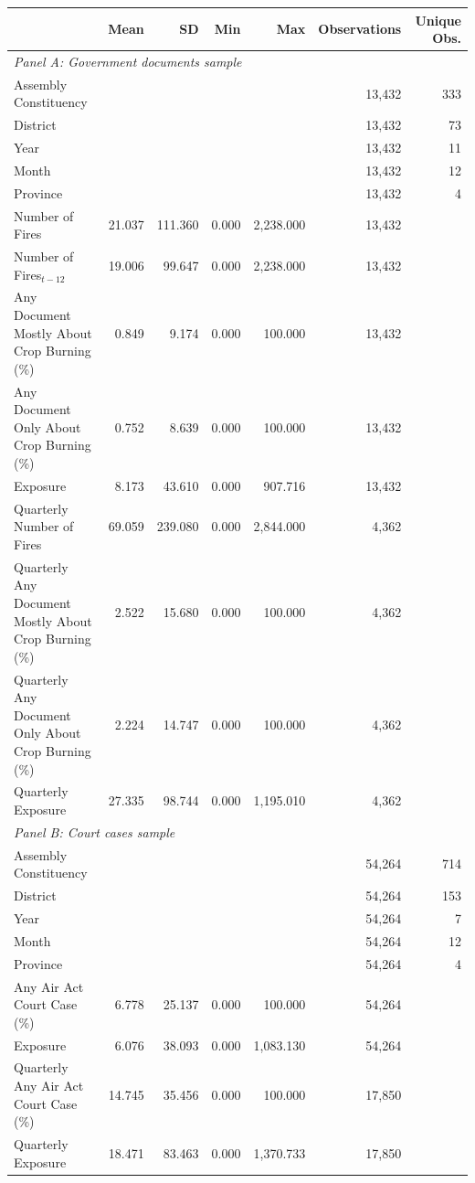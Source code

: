 \begin{tabular}{lrrrrrr}
\toprule
 & Mean & SD & Min & Max & Observations & Unique Obs.\\
\midrule
\multicolumn{7}{l}{\textit{Panel A: Government documents sample}}\\
Assembly Constituency &  &  &  &  & 13,432 & 333\\
District &  &  &  &  & 13,432 & 73\\
Year &  &  &  &  & 13,432 & 11\\
Month &  &  &  &  & 13,432 & 12\\
Province &  &  &  &  & 13,432 & 4\\
Number of Fires & 21.037 & 111.360 & 0.000 & 2,238.000 & 13,432 & \\
Number of Fires$_{t-12}$ & 19.006 & 99.647 & 0.000 & 2,238.000 & 13,432 & \\
Any Document Mostly About Crop Burning (\%) & 0.849 & 9.174 & 0.000 & 100.000 & 13,432 & \\
Any Document Only About Crop Burning (\%) & 0.752 & 8.639 & 0.000 & 100.000 & 13,432 & \\
Exposure & 8.173 & 43.610 & 0.000 & 907.716 & 13,432 & \\
Quarterly Number of Fires & 69.059 & 239.080 & 0.000 & 2,844.000 & 4,362 & \\
Quarterly Any Document Mostly About Crop Burning (\%) & 2.522 & 15.680 & 0.000 & 100.000 & 4,362 & \\
Quarterly Any Document Only About Crop Burning (\%) & 2.224 & 14.747 & 0.000 & 100.000 & 4,362 & \\
Quarterly Exposure & 27.335 & 98.744 & 0.000 & 1,195.010 & 4,362 & \\
\midrule
\multicolumn{7}{l}{\textit{Panel B: Court cases sample}}\\
Assembly Constituency &  &  &  &  & 54,264 & 714\\
District &  &  &  &  & 54,264 & 153\\
Year &  &  &  &  & 54,264 & 7\\
Month &  &  &  &  & 54,264 & 12\\
Province &  &  &  &  & 54,264 & 4\\
Any Air Act Court Case (\%) & 6.778 & 25.137 & 0.000 & 100.000 & 54,264 & \\
Exposure & 6.076 & 38.093 & 0.000 & 1,083.130 & 54,264 & \\
Quarterly Any Air Act Court Case (\%) & 14.745 & 35.456 & 0.000 & 100.000 & 17,850 & \\
Quarterly Exposure & 18.471 & 83.463 & 0.000 & 1,370.733 & 17,850 & \\
\bottomrule
\end{tabular}
